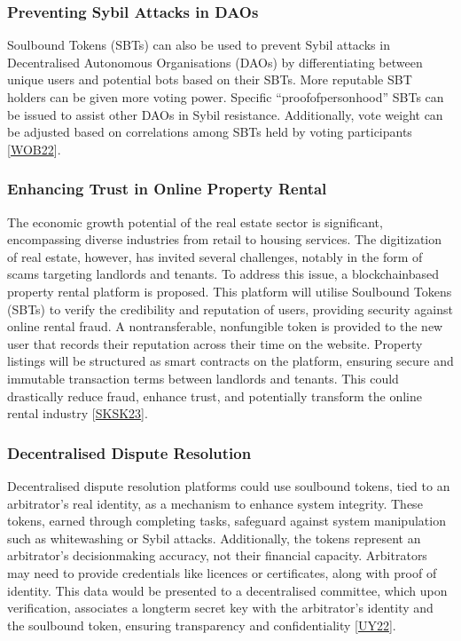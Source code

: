 \documentclass[letterpaper,10pt,english]{jupyterBook}
\begin{document}
\subsubsection{Preventing Sybil Attacks in DAOs}
\label{\detokenize{SBT/SBT:preventing-sybil-attacks-in-daos}}
\sphinxAtStartPar
Soulbound Tokens (SBTs) can also be used to prevent Sybil attacks in Decentralised Autonomous Organisations (DAOs) by differentiating between unique users and potential bots based on their SBTs. More reputable SBT holders can be given more voting power. Specific “proof\sphinxhyphen{}of\sphinxhyphen{}personhood” SBTs can be issued to assist other DAOs in Sybil resistance. Additionally, vote weight can be adjusted based on correlations among SBTs held by voting participants {[}\hyperlink{cite.SBT/SBT:id86}{WOB22}{]}.


\subsubsection{Enhancing Trust in Online Property Rental}
\label{\detokenize{SBT/SBT:enhancing-trust-in-online-property-rental}}
\sphinxAtStartPar
The economic growth potential of the real estate sector is significant, encompassing diverse industries from retail to housing services. The digitization of real estate, however, has invited several challenges, notably in the form of scams targeting landlords and tenants. To address this issue, a blockchain\sphinxhyphen{}based property rental platform is proposed. This platform will utilise Soulbound Tokens (SBTs) to verify the credibility and reputation of users, providing security against online rental fraud. A non\sphinxhyphen{}transferable, non\sphinxhyphen{}fungible token is provided to the new user that records their reputation across their time on the website. Property listings will be structured as smart contracts on the platform, ensuring secure and immutable transaction terms between landlords and tenants. This could drastically reduce fraud, enhance trust, and potentially transform the online rental industry {[}\hyperlink{cite.SBT/SBT:id83}{SKSK23}{]}.


\subsubsection{Decentralised Dispute Resolution}
\label{\detokenize{SBT/SBT:decentralised-dispute-resolution}}
\sphinxAtStartPar
Decentralised dispute resolution platforms could use soulbound tokens, tied to an arbitrator’s real identity, as a mechanism to enhance system integrity. These tokens, earned through completing tasks, safeguard against system manipulation such as whitewashing or Sybil attacks. Additionally, the tokens represent an arbitrator’s decision\sphinxhyphen{}making accuracy, not their financial capacity. Arbitrators may need to provide credentials like licences or certificates, along with proof of identity. This data would be presented to a decentralised committee, which upon verification, associates a long\sphinxhyphen{}term secret key with the arbitrator’s identity and the soulbound token, ensuring transparency and confidentiality {[}\hyperlink{cite.SBT/SBT:id85}{UY22}{]}.
\end{document}

